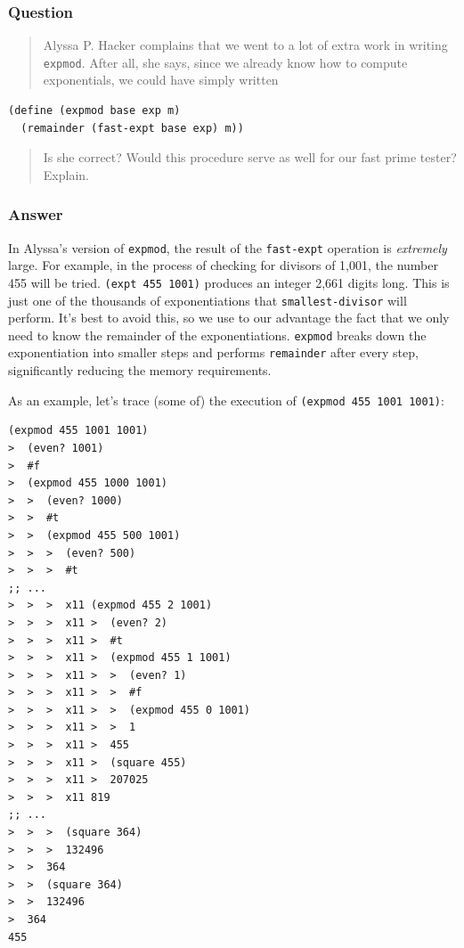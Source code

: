 \documentclass[final,fleqn,titlepage]{article}
\begin{document}
\subsubsection{Question}
\label{sec:org7990251}
\begin{quote}
Alyssa P. Hacker complains that we went to a lot of extra work in writing
\texttt{expmod}. After all, she says, since we already know how to compute
exponentials, we could have simply written
\end{quote}

\begin{verbatim}
(define (expmod base exp m)
  (remainder (fast-expt base exp) m))
\end{verbatim}

\begin{quote}
Is she correct? Would this procedure serve as well for our fast prime tester?
Explain.
\end{quote}

\subsubsection{Answer}
\label{sec:orgd293493}
In Alyssa's version of \texttt{expmod}, the result of the \texttt{fast-expt} operation is
\emph{extremely} large. For example, in the process of checking for divisors of
1,001, the number 455 will be tried. \texttt{(expt 455 1001)} produces an
integer 2,661 digits long. This is just one of the thousands of exponentiations
that \texttt{smallest-divisor} will perform. It's best to avoid this, so we use to our
advantage the fact that we only need to know the remainder of the
exponentiations. \texttt{expmod} breaks down the exponentiation into smaller steps and
performs \texttt{remainder} after every step, significantly reducing the memory
requirements.

As an example, let's trace (some of) the execution of \texttt{(expmod 455 1001 1001)}:

\begin{verbatim}
(expmod 455 1001 1001)
>  (even? 1001)
>  #f
>  (expmod 455 1000 1001)
>  >  (even? 1000)
>  >  #t
>  >  (expmod 455 500 1001)
>  >  >  (even? 500)
>  >  >  #t
;; ...
>  >  >  x11 (expmod 455 2 1001)
>  >  >  x11 >  (even? 2)
>  >  >  x11 >  #t
>  >  >  x11 >  (expmod 455 1 1001)
>  >  >  x11 >  >  (even? 1)
>  >  >  x11 >  >  #f
>  >  >  x11 >  >  (expmod 455 0 1001)
>  >  >  x11 >  >  1
>  >  >  x11 >  455
>  >  >  x11 >  (square 455)
>  >  >  x11 >  207025
>  >  >  x11 819
;; ...
>  >  >  (square 364)
>  >  >  132496
>  >  364
>  >  (square 364)
>  >  132496
>  364
455
\end{verbatim}
\end{document}
